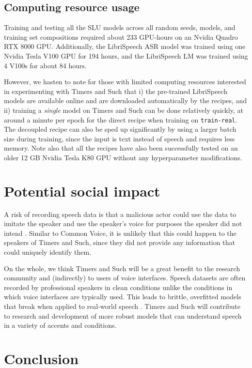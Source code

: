 \documentclass{article}
\begin{document}
\subsection{Computing resource usage}\label{compute-usage}
Training and testing all the SLU models across all random seeds, models, and training set compositions required about  233 GPU-hours on an Nvidia Quadro RTX 8000 GPU.
Additionally, the LibriSpeech ASR model was trained using one Nvidia Tesla V100 GPU for 194 hours, and the LibriSpeech LM was trained using 4 V100s for about 84 hours.

However, we hasten to note for those with limited computing resources interested in experimenting with Timers and Such that i) the pre-trained LibriSpeech models are available online and are downloaded automatically by the recipes, and ii) training a \textit{single} model on Timers and Such can be done relatively quickly, at around a minute per epoch for the direct recipe when training on \texttt{train-real}. The decoupled recipe can also be sped up significantly by using a larger batch size during training, since the input is text instead of speech and requires less memory. Note also that all the recipes have also been successfully tested on an older 12 GB Nvidia Tesla K80 GPU without any hyperparameter modifications.

\section{Potential social impact}\label{social-impact}
A risk of recording speech data is that a malicious actor could use the data to imitate the speaker and use the speaker's voice for purposes the speaker did not intend \cite{ovadya2019reducing}. Similar to Common Voice, it is unlikely that this could happen to the speakers of Timers and Such, since they did not provide any information that could uniquely identify them. 

On the whole, we think Timers and Such will be a great benefit to the research community and (indirectly) to users of voice interfaces. Speech datasets are often recorded by professional speakers in clean conditions unlike the conditions in which voice interfaces are typically used. This leads to brittle, overfitted models that break when applied to real-world speech \cite{likhomanenko2020rethinking}. Timers and Such will contribute to research and development of more robust models that can understand speech in a variety of accents and conditions.


\section{Conclusion}
\end{document}
